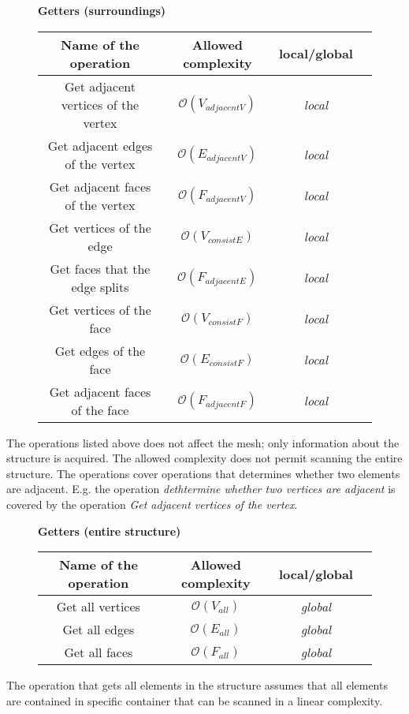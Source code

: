 \begin{figure}[!hbf]

\centering
\textbf{Getters (surroundings)}\\
\vspace{2mm}
\begin{tabular}{| c | c | c | c |}
\hline
\textbf{Name of the operation} & \textbf{Allowed complexity} & \textbf{local/global}\\
\hline
Get adjacent vertices of the vertex& $\mathcal{O}(V_{adjacentV})$ & \emph{local}\\
\hline
Get adjacent edges of the vertex& $\mathcal{O}(E_{adjacentV})$ & \emph{local}\\
\hline
Get adjacent faces of the vertex& $\mathcal{O}(F_{adjacentV})$ & \emph{local}\\
\hline
Get vertices of the edge& $\mathcal{O}(V_{consistE})$ & \emph{local}\\
\hline
Get faces that the edge splits& $\mathcal{O}(F_{adjacentE})$ & \emph{local}\\
\hline
Get vertices of the face& $\mathcal{O}(V_{consistF})$ & \emph{local}\\
\hline
Get edges of the face& $\mathcal{O}(E_{consistF})$ & \emph{local}\\
\hline
Get adjacent faces of the face& $\mathcal{O}(F_{adjacentF})$ & \emph{local}\\
\hline
\end{tabular}
\end{figure}
The operations listed above does not affect the mesh; only information about the
structure is acquired. The allowed complexity does not permit scanning the entire structure.
The operations cover operations that determines whether two elements are adjacent.
E.g. the operation \emph{dethtermine whether two vertices are adjacent} is covered by the
operation \emph{Get adjacent vertices of the vertex}.

\begin{figure}[!hbf]
\centering
\textbf{Getters (entire structure)}\\
\vspace{2mm}
\begin{tabular}{| c | c | c | c |}
\hline
\textbf{Name of the operation} & \textbf{Allowed complexity} & \textbf{local/global}\\
\hline
Get all vertices & $\mathcal{O}(V_{all})$ & \emph{global}\\
\hline
Get all edges & $\mathcal{O}(E_{all})$ & \emph{global}\\
\hline
Get all faces & $\mathcal{O}(F_{all})$ & \emph{global}\\
\hline
\end{tabular}
\end{figure}
The operation that gets all elements in the structure assumes that all elements are contained
in specific container that can be scanned in a linear complexity.